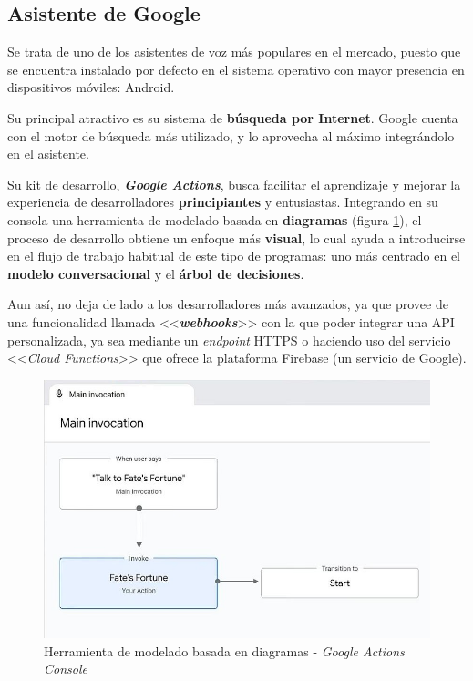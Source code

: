 \documentclass[11pt,spanish,listoffigures,listoftables,table,hyphens,dvipsnames]{tfgetsinf}
\begin{document}
\subsection{Asistente de Google}

Se trata de uno de los asistentes de voz más populares en el mercado, puesto que se encuentra instalado por defecto en el sistema operativo con mayor presencia en dispositivos móviles: Android.

Su principal atractivo es su sistema de \textbf{búsqueda por Internet}. Google cuenta con el motor de búsqueda más utilizado, y lo aprovecha al máximo integrándolo en el asistente.

Su kit de desarrollo, \textbf{\emph{Google Actions}}, busca facilitar el aprendizaje y mejorar la experiencia de desarrolladores \textbf{principiantes} y entusiastas. Integrando en su consola una herramienta de modelado basada en \textbf{diagramas} (figura \ref{figura:google-actions-console}), el proceso de desarrollo obtiene un enfoque más \textbf{visual}, lo cual ayuda a introducirse en el flujo de trabajo habitual de este tipo de programas: uno más centrado en el \textbf{modelo conversacional} y el \textbf{árbol de decisiones}.

Aun así, no deja de lado a los desarrolladores más avanzados, ya que provee de una funcionalidad llamada <<\textbf{\emph{webhooks}}>> con la que poder integrar una API personalizada, ya sea mediante un \emph{endpoint} HTTPS o haciendo uso del servicio <<\emph{Cloud Functions}>> que ofrece la plataforma Firebase (un servicio de Google).

\begin{figure}[ht]
   \centering
   \includegraphics[width=\textwidth]{google-actions-console.jpg}
   \caption{Herramienta de modelado basada en diagramas - \emph{Google Actions Console}}
   \label{figura:google-actions-console}
\end{figure}
\end{document}
